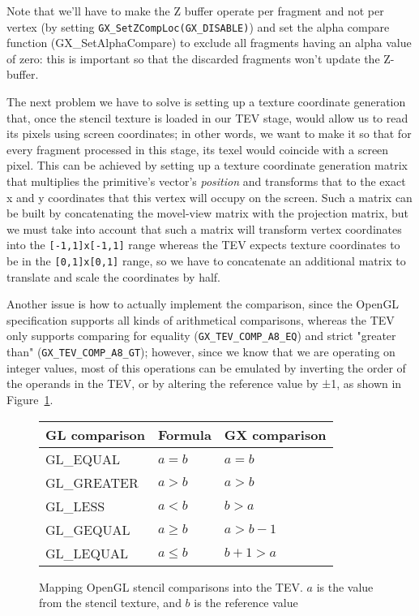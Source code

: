 \documentclass[12pt]{article}
\newcommand{\fname}[1] {{\color{blue}#1}}
\begin{document}
Note that we'll have to make the Z buffer operate per fragment and not per vertex (by setting \lstinline{GX_SetZCompLoc(GX_DISABLE)}) and set the alpha compare function (\fname{GX\_SetAlphaCompare}) to exclude all fragments having an alpha value of zero: this is important so that the discarded fragments won't update the Z-buffer.

The next problem we have to solve is setting up a texture coordinate generation that, once the stencil texture is loaded in our TEV stage, would allow us to read its pixels using screen coordinates; in other words, we want to make it so that for every fragment processed in this stage, its texel would coincide with a screen pixel. This can be achieved by setting up a texture coordinate generation matrix that multiplies the primitive's vector's \emph{position} and transforms that to the exact x and y coordinates that this vertex will occupy on the screen. Such a matrix can be built by concatenating the movel-view matrix with the projection matrix, but we must take into account that such a matrix will transform vertex coordinates into the \lstinline{[-1,1]x[-1,1]} range whereas the TEV expects texture coordinates to be in the \lstinline{[0,1]x[0,1]} range, so we have to concatenate an additional matrix to translate and scale the coordinates by half.

Another issue is how to actually implement the comparison, since the OpenGL specification supports all kinds of arithmetical comparisons, whereas the TEV only supports comparing for equality (\lstinline{GX_TEV_COMP_A8_EQ}) and strict "greater than" (\lstinline{GX_TEV_COMP_A8_GT}); however, since we know that we are operating on integer values, most of this operations can be emulated by inverting the order of the operands in the TEV, or by altering the reference value by ±1, as shown in Figure~\ref{table:stencil1}.

\begin{figure}[ht]
\centering

\begin{tabular}{|l|l|l|}
\hline
    {GL comparison} & {Formula} & {GX comparison} \\
\hline
    GL\_EQUAL & $a = b$ & $a = b$ \\
\hline
	GL\_GREATER & $a > b$ & $a > b$\\
\hline
	GL\_LESS & $a < b$ & $b > a$\\
\hline
	GL\_GEQUAL & $a \geq b$ & $a > b - 1$ \\
\hline
	GL\_LEQUAL & $a \leq b$ & $b + 1 > a$ \\
\hline
\end{tabular}
\caption{Mapping OpenGL stencil comparisons into the TEV. $a$ is the value from the stencil texture, and $b$ is the reference value}
\label{table:stencil1}
\end {figure}
\end{document}
